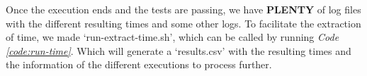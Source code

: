 \documentclass[../main.tex]{subfiles}
\begin{document}
Once the execution ends and the tests are passing, we have \textbf{PLENTY} of log files with the different resulting times and some other logs. To facilitate the extraction of time, we made `run-extract-time.sh', which can be called by running \textit{Code \ref{code:run-time}}.
Which will generate a `results.csv' with the resulting times and the information of the different executions to process further.

\end{document}
